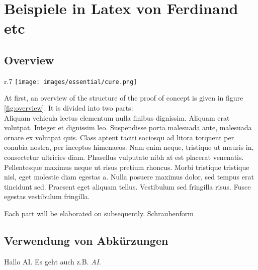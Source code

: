 
\chapter*{Beispiele in Latex von Ferdinand etc}

\section*{Overview}
\label{section:overview}

\begin{wrapfigure}{r}{.7\textwidth}
\centering
\texttt{[image: images/essential/cure.png]}
\vspace{-5pt}
\caption{Overview of the proof of concept}
\label{fig:overview}
\end{wrapfigure}

At first, an overview of the structure of the proof of concept is given in figure \ref{fig:overview}.
It is divided into two parts: \cite{Boge.2021}\\
Aliquam vehicula lectus elementum nulla finibus dignissim. Aliquam erat volutpat. Integer et dignissim leo. Suspendisse porta malesuada ante, malesuada ornare ex volutpat quis. Class aptent taciti sociosqu ad litora torquent per conubia nostra, per inceptos himenaeos. Nam enim neque, tristique ut mauris in, consectetur ultricies diam. Phasellus vulputate nibh at est placerat venenatis. Pellentesque maximus neque ut risus pretium rhoncus. Morbi tristique tristique nisl, eget molestie diam egestas a. Nulla posuere maximus dolor, sed tempus erat tincidunt sed. Praesent eget aliquam tellus. Vestibulum sed fringilla risus. Fusce egestas vestibulum fringilla.

Each part will be elaborated on subsequently. \gls{Schraubenform} 

\section*{Verwendung von Abkürzungen}
Hallo \acs{AI}.
Es geht auch z.B. \textit{\acf{AI}}.
